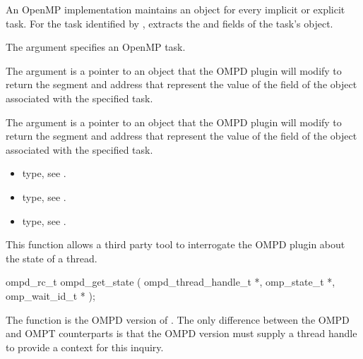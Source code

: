 \descr
An OpenMP implementation  maintains an  object for every implicit or explicit task. 
For the task identified by ,  extracts 
the  and  fields of the task's  object.

\argdesc

The argument  specifies an OpenMP task.

The argument  is a pointer to an  object that the OMPD plugin will 
modify to return the segment and address that represent the value of the  
field of the  object associated with the specified task.

The argument  is a pointer to an  object that the OMPD plugin will 
modify to return the segment and address that represent the value of the  
field of the  object associated with the specified task.

\crossreferences
\begin{itemize}
	\item {} type, see .
	\item {} type, see .
	\item {} type, see .
\end{itemize}


\label{ompd:ompd_get_state}
\summary
This function allows a third party tool to interrogate the OMPD plugin about the state of a thread.

\format
\cspecificstart
\begin{ompSyntax}
ompd_rc_t ompd_get_state (
  ompd_thread_handle_t *,
  omp_state_t *,
  omp_wait_id_t *
);
\end{ompSyntax}
\cspecificend

\descr
The function  is the  OMPD version of
. 
The only difference between the OMPD and OMPT counterparts
is that the OMPD version must supply a thread handle to provide
a context for this inquiry.

\argdesc


